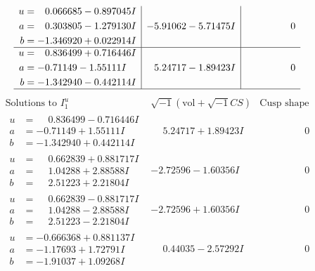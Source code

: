 \documentclass[1p]{elsarticle_modified}
\theoremstyle{definition}
\newcommand{\I}{\sqrt{-1}}
\begin{document}
$$\begin{array}{c|c|c}
\begin{aligned}
u &= \phantom{-}0.066685 - 0.897045 I \\
a &= \phantom{-}0.303805 - 1.279130 I \\
b &= -1.346920 + 0.022914 I\end{aligned}
 & -5.91062 - 5.71475 I & \phantom{-0.000000 } 0 \\ \hline\begin{aligned}
u &= \phantom{-}0.836499 + 0.716446 I \\
a &= -0.71149 - 1.55111 I \\
b &= -1.342940 - 0.442114 I\end{aligned}
 & \phantom{-}5.24717 - 1.89423 I & \phantom{-0.000000 } 0\\
 \hline 
 \end{array}$$\newpage$$\begin{array}{c|c|c}  
\text{Solutions to }I^u_{1}& \I (\text{vol} + \sqrt{-1}CS) & \text{Cusp shape}\\
 \hline 
\begin{aligned}
u &= \phantom{-}0.836499 - 0.716446 I \\
a &= -0.71149 + 1.55111 I \\
b &= -1.342940 + 0.442114 I\end{aligned}
 & \phantom{-}5.24717 + 1.89423 I & \phantom{-0.000000 } 0 \\ \hline\begin{aligned}
u &= \phantom{-}0.662839 + 0.881717 I \\
a &= \phantom{-}1.04288 + 2.88588 I \\
b &= \phantom{-}2.51223 + 2.21804 I\end{aligned}
 & -2.72596 - 1.60356 I & \phantom{-0.000000 } 0 \\ \hline\begin{aligned}
u &= \phantom{-}0.662839 - 0.881717 I \\
a &= \phantom{-}1.04288 - 2.88588 I \\
b &= \phantom{-}2.51223 - 2.21804 I\end{aligned}
 & -2.72596 + 1.60356 I & \phantom{-0.000000 } 0 \\ \hline\begin{aligned}
u &= -0.666368 + 0.881137 I \\
a &= -1.17693 + 1.72791 I \\
b &= -1.91037 + 1.09268 I\end{aligned}
 & \phantom{-}0.44035 - 2.57292 I & \phantom{-0.000000 } 0 \\ \hline\begin{aligned}

\end{aligned}
\end{array}$$
\end{document}
